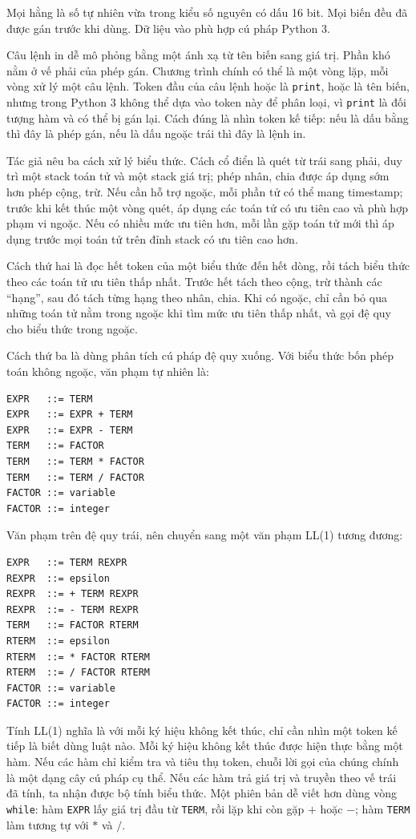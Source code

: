 \documentclass[11pt]{article}
\begin{document}
Mọi hằng là số tự nhiên vừa trong kiểu số nguyên có dấu 16 bit. Mọi biến đều đã
được gán trước khi dùng. Dữ liệu vào phù hợp cú pháp Python 3.

Câu lệnh in dễ mô phỏng bằng một ánh xạ từ tên biến sang giá trị. Phần khó nằm
ở vế phải của phép gán. Chương trình chính có thể là một vòng lặp, mỗi vòng xử
lý một câu lệnh. Token đầu của câu lệnh hoặc là \texttt{print}, hoặc là tên
biến, nhưng trong Python 3 không thể dựa vào token này để phân loại, vì
\texttt{print} là đối tượng hàm và có thể bị gán lại. Cách đúng là nhìn token
kế tiếp: nếu là dấu bằng thì đây là phép gán, nếu là dấu ngoặc trái thì đây là
lệnh in.

Tác giả nêu ba cách xử lý biểu thức. Cách cổ điển là quét từ trái sang phải,
duy trì một stack toán tử và một stack giá trị; phép nhân, chia được áp dụng
sớm hơn phép cộng, trừ. Nếu cần hỗ trợ ngoặc, mỗi phần tử có thể mang timestamp;
trước khi kết thúc một vòng quét, áp dụng các toán tử có ưu tiên cao và phù hợp
phạm vi ngoặc. Nếu có nhiều mức ưu tiên hơn, mỗi lần gặp toán tử mới thì áp
dụng trước mọi toán tử trên đỉnh stack có ưu tiên cao hơn.

Cách thứ hai là đọc hết token của một biểu thức đến hết dòng, rồi tách biểu
thức theo các toán tử ưu tiên thấp nhất. Trước hết tách theo cộng, trừ thành
các ``hạng'', sau đó tách từng hạng theo nhân, chia. Khi có ngoặc, chỉ cần bỏ
qua những toán tử nằm trong ngoặc khi tìm mức ưu tiên thấp nhất, và gọi đệ quy
cho biểu thức trong ngoặc.

Cách thứ ba là dùng phân tích cú pháp đệ quy xuống. Với biểu thức bốn phép toán
không ngoặc, văn phạm tự nhiên là:

\begin{verbatim}
EXPR   ::= TERM
EXPR   ::= EXPR + TERM
EXPR   ::= EXPR - TERM
TERM   ::= FACTOR
TERM   ::= TERM * FACTOR
TERM   ::= TERM / FACTOR
FACTOR ::= variable
FACTOR ::= integer
\end{verbatim}

Văn phạm trên đệ quy trái, nên chuyển sang một văn phạm LL(1) tương đương:

\begin{verbatim}
EXPR   ::= TERM REXPR
REXPR  ::= epsilon
REXPR  ::= + TERM REXPR
REXPR  ::= - TERM REXPR
TERM   ::= FACTOR RTERM
RTERM  ::= epsilon
RTERM  ::= * FACTOR RTERM
RTERM  ::= / FACTOR RTERM
FACTOR ::= variable
FACTOR ::= integer
\end{verbatim}

Tính LL(1) nghĩa là với mỗi ký hiệu không kết thúc, chỉ cần nhìn một token kế
tiếp là biết dùng luật nào. Mỗi ký hiệu không kết thúc được hiện thực bằng một
hàm. Nếu các hàm chỉ kiểm tra và tiêu thụ token, chuỗi lời gọi của chúng chính
là một dạng cây cú pháp cụ thể. Nếu các hàm trả giá trị và truyền theo vế trái
đã tính, ta nhận được bộ tính biểu thức. Một phiên bản dễ viết hơn dùng vòng
\texttt{while}: hàm \texttt{EXPR} lấy giá trị đầu từ \texttt{TERM}, rồi lặp khi
còn gặp \(+\) hoặc \(-\); hàm \texttt{TERM} làm tương tự với \(*\) và \(/\).
\end{document}
